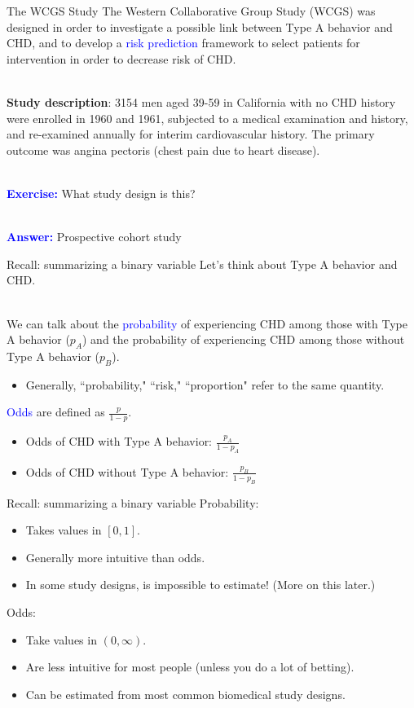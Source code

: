 \documentclass[10pt,t]{beamer}
\begin{document}
\begin{frame}{The WCGS Study}
	The Western Collaborative Group Study (WCGS) was designed in order to investigate a possible link between Type A behavior and CHD, and to develop a \textcolor{blue}{risk prediction} framework to select patients for intervention in order to decrease risk of CHD. 
	\\ ~\ 
	
	\textbf{Study description}: 3154 men aged 39-59 in California with no CHD history were enrolled in 1960 and 1961, subjected to a medical examination and history, and re-examined annually for interim cardiovascular history. The primary outcome was angina pectoris (chest pain due to heart disease). 
	\\ ~\
	
	\textcolor{blue}{\textbf{Exercise:}} What study design is this? \pause
	\\~\
	
	\textcolor{blue}{\textbf{Answer:}} Prospective cohort study
\end{frame}

\begin{frame}{Recall: summarizing a binary variable}
	Let's think about Type A behavior  and CHD. 
	\\ ~\ 
	
	We can talk about the \textcolor{blue}{probability} of experiencing CHD among those with Type A behavior ($p_A$) and the probability of experiencing CHD among those without Type A behavior ($p_B$).
	\begin{itemize}
		\item Generally, ``probability," ``risk," ``proportion" refer to the same quantity.
	\end{itemize}\pause 
	\textcolor{blue}{Odds} are defined as $\frac{p}{1-p}$.
	\begin{itemize}
		\item Odds of CHD with Type A behavior: $\frac{p_A}{1-p_A}$
		\item Odds of CHD without Type A behavior: $\frac{p_B}{1-p_B}$
	\end{itemize}
\end{frame}

\begin{frame}{Recall: summarizing a binary variable}
Probability:
\begin{itemize}
	\item Takes values in $[0,1]$.
	\item Generally more intuitive than odds. 
	\item In some study designs, is impossible to estimate! (More on this later.)
\end{itemize} \pause 
Odds:
\begin{itemize}
	\item Take values in $(0,\infty)$.
	\item Are less intuitive for most people (unless you do a lot of betting).
	\item Can be estimated from most common biomedical study designs. 
\end{itemize}
\end{frame}
\end{document}
